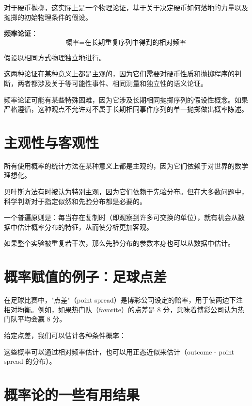 对于硬币抛掷，这实际上是一个物理论证，基于关于决定硬币如何落地的力量以及抛掷的初始物理条件的假设。

\textbf{频率论证}：
\[
\text{概率} = \text{在长期重复序列中得到的相对频率}
\]

假设以相同方式物理独立地进行。

这两种论证在某种意义上都是主观的，因为它们需要对硬币性质和抛掷程序的判断，两者都涉及关于等可能性事件、相同测量和独立性的语义论证。

频率论证可能有某些特殊困难，因为它涉及长期相同抛掷序列的假设性概念。如果严格遵循，这种观点不允许对不属于长期相同事件序列的单一抛掷做出概率陈述。

\section{主观性与客观性}

所有使用概率的统计方法在某种意义上都是主观的，因为它们依赖于对世界的数学理想化。

贝叶斯方法有时被认为特别主观，因为它们依赖于先验分布。但在大多数问题中，科学判断对于指定似然和先验分布都是必要的。

一个普遍原则是：每当存在复制时（即观察到许多可交换的单位），就有机会从数据中估计概率分布的特征，从而使分析更加客观。

如果整个实验被重复若干次，那么先验分布的参数本身也可以从数据中估计。

\section{概率赋值的例子：足球点差}

在足球比赛中，"点差"（point spread）是博彩公司设定的赔率，用于使两边下注相对均衡。例如，如果热门队（favorite）的点差是 8 分，意味着博彩公司认为热门队平均会赢 8 分。

给定点差，我们可以估计各种条件概率：

这些概率可以通过相对频率估计，也可以用正态近似来估计（outcome - point spread 的分布）。

\section{概率论的一些有用结果}

